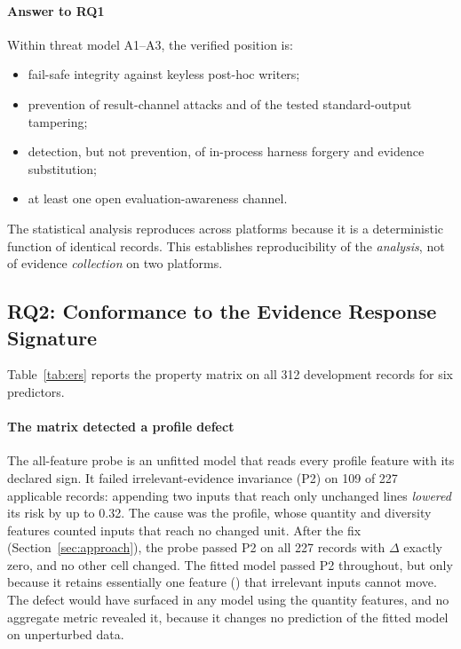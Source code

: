 \paragraph*{Answer to RQ1} Within threat model A1--A3, the verified position is:
\begin{itemize}
\item fail-safe integrity against keyless post-hoc writers;
\item prevention of result-channel attacks and of the tested standard-output tampering;
\item detection, but not prevention, of in-process harness forgery and evidence substitution;
\item at least one open evaluation-awareness channel.
\end{itemize}
The statistical analysis reproduces across platforms because it is a deterministic function of identical records. This establishes reproducibility of the \emph{analysis}, not of evidence \emph{collection} on two platforms.




\subsection{RQ2: Conformance to the Evidence Response Signature}\label{sec:res-rq2}
Table~\ref{tab:ers} reports the property matrix on all 312 development records for six predictors.

\paragraph*{The matrix detected a profile defect} The all-feature probe is an unfitted model that reads every profile feature with its declared sign. It failed irrelevant-evidence invariance (P2) on 109 of 227 applicable records: appending two inputs that reach only unchanged lines \emph{lowered} its risk by up to 0.32. The cause was the profile, whose quantity and diversity features counted inputs that reach no changed unit. After the fix (Section~\ref{sec:approach}), the probe passed P2 on all 227 records with $\Delta$ exactly zero, and no other cell changed. The fitted model passed P2 throughout, but only because it retains essentially one feature () that irrelevant inputs cannot move. The defect would have surfaced in any model using the quantity features, and no aggregate metric revealed it, because it changes no prediction of the fitted model on unperturbed data.

